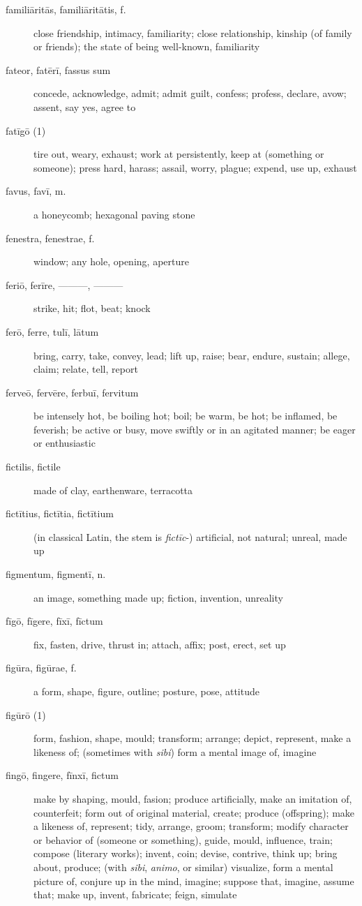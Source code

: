 \begin{description}
    \item[familiāritās, familiāritātis, f.] close friendship, intimacy, familiarity; close relationship, kinship (of family or friends); the state of being well-known, familiarity
    \item[fateor, fatērī, fassus sum] \marginnote{*}concede, acknowledge, admit; admit guilt, confess; profess, declare, avow; assent, say yes, agree to
    \item[fatīgō (1)] tire out, weary, exhaust; work at persistently, keep at (something or someone); press hard, harass; assail, worry, plague; expend, use up, exhaust
    \item[favus, favī, m.] a honeycomb; hexagonal paving stone
    \item[fenestra, fenestrae, f.] window; any hole, opening, aperture
    \item[feriō, ferīre, ———, ———] strike, hit; flot, beat; knock
    \item[ferō, ferre, tulī, lātum] \marginnote{*}bring, carry, take, convey, lead; lift up, raise; bear, endure, sustain; allege, claim; relate, tell, report
    \item[ferveō, fervēre, ferbuī, fervitum] be intensely hot, be boiling hot; boil; be warm, be hot; be inflamed, be feverish; be active or busy, move swiftly or in an agitated manner; be eager or enthusiastic
    \item[fictilis, fictile] made of clay, earthenware, terracotta
    \item[fictītius, fictītia, fictītium]  (in classical Latin, the stem is \textit{fictīc}-) artificial, not natural; unreal, made up
    \item[figmentum, figmentī, n.] an image, something made up; fiction, invention, unreality
    \item[fīgō, fīgere, fīxī, fīctum] fix, fasten, drive, thrust in; attach, affix; post, erect, set up
    \item[figūra, figūrae, f.] a form, shape, figure, outline; posture, pose, attitude
    \item[figūrō (1)] form, fashion, shape, mould; transform; arrange; depict, represent, make a likeness of; (sometimes with \textit{sibi}) form a mental image of, imagine
    \item[fingō, fingere, fīnxī, fictum] \marginnote{*}make by shaping, mould, fasion; produce artificially, make an imitation of, counterfeit; form out of original material, create; produce (offspring); make a likeness of, represent; tidy, arrange, groom; transform; modify character or behavior of (someone or something), guide, mould, influence, train; compose (literary works); invent, coin; devise, contrive, think up; bring about, produce; (with \textit{sibi}, \textit{animo}, or similar) visualize, form a mental picture of, conjure up in the mind, imagine; suppose that, imagine, assume that; make up, invent, fabricate; feign, simulate

\end{description}
